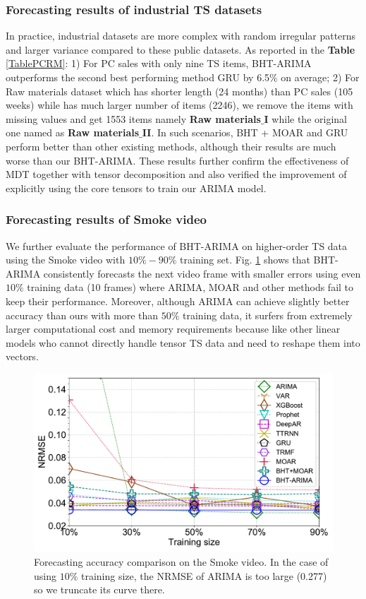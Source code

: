 \documentclass[letterpaper]{article} %
\numberwithin{theorem}{section}
\begin{document}
\subsubsection{Forecasting results of  industrial TS datasets}
In practice, industrial datasets are more complex with  random irregular patterns and larger variance compared to these  public  datasets.  As reported in the \textbf{Table} \ref{TablePCRM}: 1) For PC sales with only nine TS items,  BHT-ARIMA   outperforms the second best performing method GRU  by  6.5$\%$ on average; 2) For Raw materials dataset which has shorter length (24 months) than PC sales (105 weeks) while has much larger number of  items (2246), we remove the items with missing values and get  1553 items namely \textbf{Raw materials$\_$I} while the original one named as \textbf{Raw materials$\_$II}.  In such scenarios,  BHT + MOAR and GRU perform better than other existing methods, although their  results are much worse than our BHT-ARIMA.   These results further confirm the effectiveness of MDT together with tensor decomposition and also verified the improvement of explicitly using the core tensors to train our ARIMA model.


\subsubsection{Forecasting results of Smoke video}
We further evaluate the performance of BHT-ARIMA on higher-order TS data using the  Smoke video with $10\% - 90\%$ training set.  Fig. \ref{Figvideo} shows that BHT-ARIMA consistently forecasts the next video frame with  smaller errors using even $10\%$ training data (10 frames) where ARIMA, MOAR and other methods fail to keep their  performance. Moreover,  although ARIMA can achieve  slightly better accuracy than ours  with  more than $50\%$ training data,  it surfers from extremely larger computational cost and memory requirements because like other  linear models who cannot directly handle  tensor TS data  and  need to reshape  them into vectors.
\begin{figure}[ttt!]
	\centering
	\includegraphics[width=0.8\columnwidth ]{Fig4_Video_TSF.pdf}
	\caption{\label{Figvideo}Forecasting accuracy comparison on the Smoke video. In the case of using $10\%$ training size,   the  NRMSE of ARIMA is too large  (0.277) so we truncate its curve there.}
\end{figure}
\end{document}
